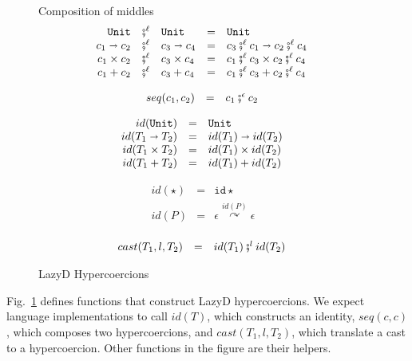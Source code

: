 \documentclass[acmsmall,review,anonymous]{acmart}\settopmatter{printfolios=true,printccs=false,printacmref=false}
\newcommand{\figref}[1]{Fig.~\ref{#1}}
\newcommand{\funrule}[3]{#1 &=& #2 & #3\\}
\newcommand{\comprule}[4]{#1 & \fatsemi^\ell & #2 & = & #3 & #4 \\}
\newcommand{\plus}[0]{+}
\newcommand{\lazyD}{Lazy\;D}
\newcommand{\POOunit}[0]{\mathtt{Unit}}
\newcommand{\POOfun}[2]{#1 \shortrightarrow #2}
\newcommand{\POOprod}[2]{#1 \times #2}
\newcommand{\POOsum}[2]{#1 \plus #2}
\newcommand{\hyperCoercionI}[0]{\mathtt{id\star}}
\newcommand{\hyperCoercionC}[3]{#1 \overset{#2}{\curvearrowright} #3}
\begin{document}
\begin{figure}
	Composition of middles 
	\[ 
	\begin{array}{rclclr}
	\comprule{\POOunit}{\POOunit}{
		\POOunit
	}{}
	\comprule{\POOfun{c_1}{c_2}}{\POOfun{c_3}{c_4}}{
		\POOfun{c_3 \fatsemi^{\ell} c_1}{c_2 \fatsemi^\ell c_4}
	}{}
	\comprule{\POOprod{c_1}{c_2}}{\POOprod{c_3}{c_4}}{
		\POOprod{c_1 \fatsemi^\ell c_3}{c_2 \fatsemi^\ell c_4}
	}{}
	\comprule{\POOsum{c_1}{c_2}}{\POOsum{c_3}{c_4}}{
		\POOsum{c_1 \fatsemi^\ell c_3}{c_2 \fatsemi^\ell c_4}
	}{}
	\end{array}
	\]
	
	\[
	\begin{array}{rclr}
	\funrule{seq(c_1,c_2)}{
		c_1 \fatsemi^\epsilon c_2
	}{}
	\end{array}
	\]
	
	\[
	\begin{array}{rclr}
	\funrule{id(\POOunit)}{\POOunit}{}
	\funrule{id(\POOfun{T_1}{T_2})}{
		\POOfun{id(T_1)}{id(T_2)}
	}{}
	\funrule{id(\POOprod{T_1}{T_2})}{
		\POOprod{id(T_1)}{id(T_2)}
	}{}
	\funrule{id(\POOsum{T_1}{T_2})}{
		\POOsum{id(T_1)}{id(T_2)}
	}{}
	\end{array}
	\]
	
	\[
	\begin{array}{rclr}
	\funrule{id(\star)}{
		\hyperCoercionI
	}{}
	\funrule{id(P)}{
		\hyperCoercionC{\epsilon}{id(P)}{\epsilon}
	}{}
	\end{array}
	\]
	
	\[
	\begin{array}{rclr}
	\funrule{cast(T_1,l,T_2)}{
		id(T_1) \fatsemi^l id(T_2)
	}{}
	\end{array}
	\]
	\caption{\lazyD{} Hypercoercions}
	\label{fig:HC-D}
\end{figure}

\figref{fig:HC-D} defines functions that construct \lazyD{} hypercoercions. We 
expect language implementations to call $ id(T) $, which constructs an 
identity, $ seq(c,c) $, which composes two hypercoercions, and $ 
cast(T_1,l,T_2) $, which translate a cast to a hypercoercion. Other functions 
in the figure are their helpers.
\end{document}
